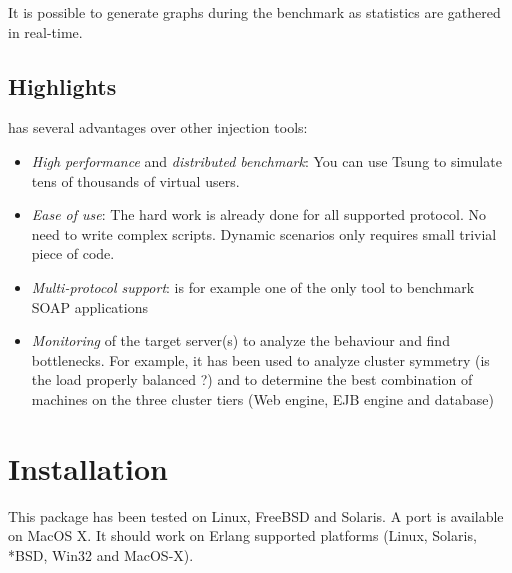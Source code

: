 \documentclass{TSUNG-en}
\begin{document}
 It is possible to generate graphs during the benchmark as statistics
are gathered in real-time.

\subsection{Highlights}

 has several advantages over other injection tools:


\begin{itemize}
\item \emph{High performance} and \emph{distributed benchmark}: You
  can use Tsung to simulate tens of thousands of virtual users.
\item \emph{Ease of use}: The hard work is already done for all supported
protocol. No need to write complex scripts. Dynamic scenarios only
requires small trivial piece of code.
\item \emph{Multi-protocol support}:  is for example one of
the only tool to benchmark SOAP applications
\item \emph{Monitoring} of the target server(s) to analyze the behaviour
and find bottlenecks. For example, it has been used to analyze cluster
symmetry (is the load properly balanced ?) and to determine the best
combination of machines on the three cluster tiers (Web engine, EJB
engine and database)
\end{itemize}



\section{Installation}

This package has been tested on Linux, FreeBSD and Solaris. A port is
available on MacOS X. It should
work on Erlang supported platforms (Linux, Solaris, *BSD, Win32 and
MacOS-X).
\end{document}
